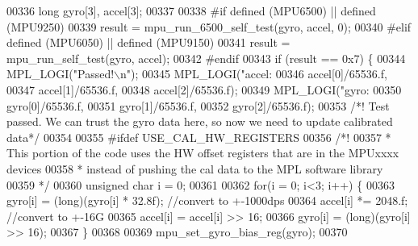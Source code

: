 \begin{DoxyCode}
{{{{{{00336     \textcolor{keywordtype}{long} gyro[3], accel[3];
00337 
00338 \textcolor{preprocessor}{#}\textcolor{preprocessor}{if} \textcolor{preprocessor}{defined} \textcolor{preprocessor}{(}\textcolor{preprocessor}{MPU6500}\textcolor{preprocessor}{)} \textcolor{preprocessor}{||} \textcolor{preprocessor}{defined} \textcolor{preprocessor}{(}\textcolor{preprocessor}{MPU9250}\textcolor{preprocessor}{)}
00339     result = mpu\_run\_6500\_self\_test(gyro, accel, 0);
00340 \textcolor{preprocessor}{#}\textcolor{preprocessor}{elif} \textcolor{preprocessor}{defined} \textcolor{preprocessor}{(}\textcolor{preprocessor}{MPU6050}\textcolor{preprocessor}{)} \textcolor{preprocessor}{||} \textcolor{preprocessor}{defined} \textcolor{preprocessor}{(}\textcolor{preprocessor}{MPU9150}\textcolor{preprocessor}{)}
00341     result = mpu\_run\_self\_test(gyro, accel);
00342 \textcolor{preprocessor}{#}\textcolor{preprocessor}{endif}
00343     \textcolor{keywordflow}{if} (result == 0x7) \{
00344     MPL\_LOGI(\textcolor{stringliteral}{"Passed!\(\backslash\)n"});
00345         MPL\_LOGI(\textcolor{stringliteral}{"accel: %
00346                     accel[0]/65536.f,
00347                     accel[1]/65536.f,
00348                     accel[2]/65536.f);
00349         MPL\_LOGI(\textcolor{stringliteral}{"gyro: %
00350                     gyro[0]/65536.f,
00351                     gyro[1]/65536.f,
00352                     gyro[2]/65536.f);
00353         \textcolor{comment}{/*! Test passed. We can trust the gyro data here, so now we need to update calibrated data*/}
00354 
00355 \textcolor{preprocessor}{#}\textcolor{preprocessor}{ifdef} \textcolor{preprocessor}{USE\_CAL\_HW\_REGISTERS}
00356         \textcolor{comment}{/*!}
00357 \textcolor{comment}{         * This portion of the code uses the HW offset registers that are in the MPUxxxx devices}
00358 \textcolor{comment}{         * instead of pushing the cal data to the MPL software library}
00359 \textcolor{comment}{         */}
00360         \textcolor{keywordtype}{unsigned} \textcolor{keywordtype}{char} i = 0;
00361 
00362         \textcolor{keywordflow}{for}(i = 0; i<3; i++) \{
00363             gyro[i] = (\textcolor{keywordtype}{long})(gyro[i] * 32.8f); \textcolor{comment}{//convert to +-1000dps}
00364             accel[i] *= 2048.f; \textcolor{comment}{//convert to +-16G}
00365             accel[i] = accel[i] >> 16;
00366             gyro[i] = (\textcolor{keywordtype}{long})(gyro[i] >> 16);
00367         \}
00368 
00369         mpu\_set\_gyro\_bias\_reg(gyro);
00370 
}}}}}}}}
\end{DoxyCode}
